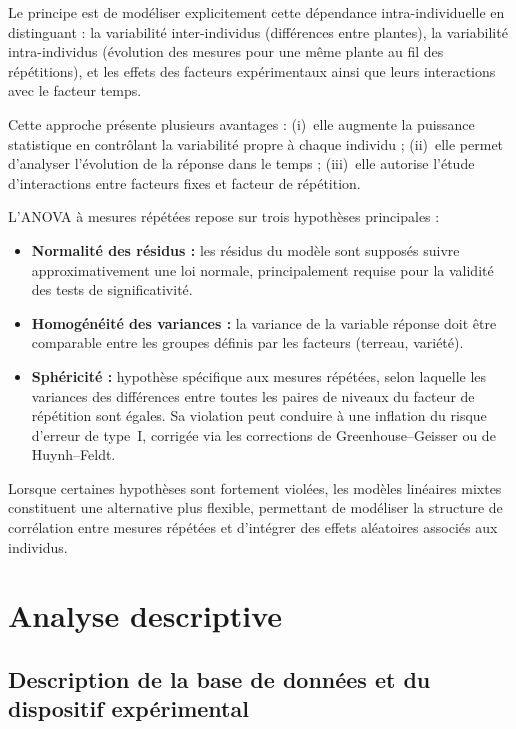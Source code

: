 \documentclass[12pt, a4paper]{report}
\begin{document}
Le principe est de modéliser explicitement cette dépendance intra-individuelle en
distinguant : la variabilité inter-individus (différences entre plantes), la variabilité
intra-individus (évolution des mesures pour une même plante au fil des répétitions), et les
effets des facteurs expérimentaux ainsi que leurs interactions avec le facteur temps.

Cette approche présente plusieurs avantages : (i)~elle augmente la puissance statistique en
contrôlant la variabilité propre à chaque individu ; (ii)~elle permet d'analyser l'évolution
de la réponse dans le temps ; (iii)~elle autorise l'étude d'interactions entre facteurs fixes
et facteur de répétition.

L'ANOVA à mesures répétées repose sur trois hypothèses principales :

\begin{itemize}[leftmargin=*, label=\textbullet]
  \item \textbf{Normalité des résidus :} les résidus du modèle sont supposés suivre
        approximativement une loi normale, principalement requise pour la validité des tests
        de significativité.
  \item \textbf{Homogénéité des variances :} la variance de la variable réponse doit être
        comparable entre les groupes définis par les facteurs (terreau, variété).
  \item \textbf{Sphéricité :} hypothèse spécifique aux mesures répétées, selon laquelle les
        variances des différences entre toutes les paires de niveaux du facteur de répétition
        sont égales. Sa violation peut conduire à une inflation du risque d'erreur de type~I,
        corrigée via les corrections de Greenhouse–Geisser ou de Huynh–Feldt.
\end{itemize}

Lorsque certaines hypothèses sont fortement violées, les modèles linéaires mixtes constituent
une alternative plus flexible, permettant de modéliser la structure de corrélation entre
mesures répétées et d'intégrer des effets aléatoires associés aux individus.

\chapter{Analyse descriptive}

\section{Description de la base de données et du dispositif expérimental}
\end{document}
